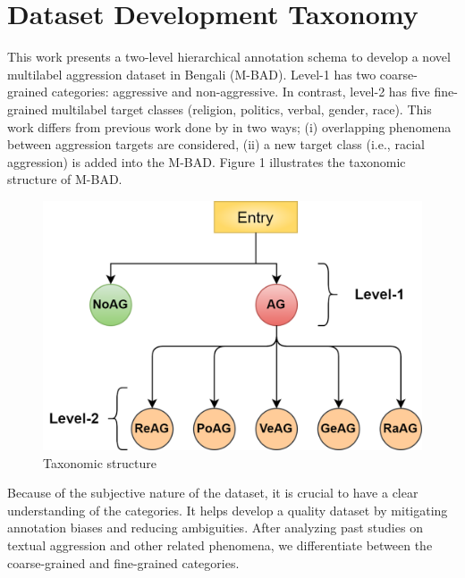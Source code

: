 \documentclass[11pt]{article}
\begin{document}
\section{Dataset Development Taxonomy}
\label{section3}
 This work presents a two-level hierarchical annotation schema to develop a novel multilabel aggression dataset in Bengali (M-BAD). Level-1 has two coarse-grained categories: aggressive and non-aggressive. In contrast, level-2 has five fine-grained multilabel target classes (religion, politics, verbal, gender, race). This work differs from previous work done by \citet{SHARIF2021} in two ways; (i) overlapping phenomena between aggression targets are considered, (ii) a new target class (i.e., racial aggression) is added into the M-BAD. Figure 1 illustrates the taxonomic structure of M-BAD.

\begin{figure}[h!]
\centering
\includegraphics[width =\linewidth]{Figure/taxonomy.png}
\caption{Taxonomic structure} 
\label{hist}
\end{figure}

Because of the subjective nature of the dataset, it is crucial to have a clear understanding of the categories. It helps develop a quality dataset by mitigating annotation biases and reducing ambiguities. After analyzing past studies \cite{SHARIF2021,bhardwaj2020hostility,zampieri-etal-2019-predicting,vidgen-etal-2021-introducing} on textual aggression and other related phenomena, we differentiate between the coarse-grained and fine-grained categories.

\end{document}
